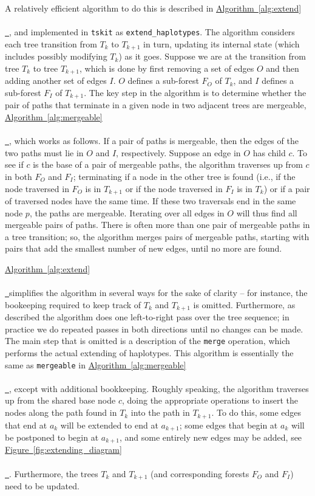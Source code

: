 \documentclass[10pt,twoside,lineno]{gsajnl}
\newcommand{\tskit}{\texttt{tskit}}
\newcommand{\algorithmref}[2][]{%
	\hyperref[{#2}]{%
		Algorithm~\ref*{#2}%
		\ifx\\#1\\%
		\else
		\,#1%
		\fi
	}%
}
\newcommand*{\figref}[2][]{%
	\hyperref[{#2}]{%
		Figure~\ref*{#2}%
		\ifx\\#1\\%
		\else
		\,#1%
		\fi
	}%
}
\begin{document}
A relatively efficient algorithm to do this is described in \algorithmref{alg:extend}, 
and implemented in \tskit{} as \texttt{extend\_haplotypes}.
The algorithm considers each tree transition from $T_k$ to $T_{k+1}$ in turn, updating its internal state
(which includes possibly modifying $T_k$) as it goes.
Suppose we are at the transition from tree $T_k$ to tree $T_{k+1}$,
which is done by first removing a set of edges $O$
and then adding another set of edges $I$.
$O$ defines a sub-forest $F_O$ of $T_k$,
and $I$ defines a sub-forest $F_I$ of $T_{k+1}$.
The key step in the algorithm is to determine whether the pair of paths
that terminate in a given node in two adjacent trees are mergeable,
\algorithmref{alg:mergeable}, which works as follows.
If a pair of paths is mergeable,
then the edges of the two paths must lie in $O$ and $I$, respectively.
Suppose an edge in $O$ has child $c$.
To see if $c$ is the base of a pair of mergeable paths,
the algorithm traverses up from $c$ in both $F_O$ and $F_I$;
terminating if a node in the other tree is found
(i.e., if the node traversed in $F_O$ is in $T_{k+1}$ or if the node traversed in $F_I$ is in $T_k$)
or if a pair of traversed nodes have the same time.
If these two traversals end in the same node $p$, the paths are mergeable.
Iterating over all edges in $O$ will thus find all mergeable pairs of paths.
There is often more than one pair of mergeable paths in a tree transition;
so, the algorithm merges pairs of mergeable paths,
starting with pairs that add the smallest number of new edges,
until no more are found.


\algorithmref{alg:extend} simplifies the algorithm in several ways for the sake of clarity --
for instance, the bookeeping required to keep track of $T_k$ and $T_{k+1}$ is omitted.
Furthermore, as described the algorithm does one left-to-right pass over the tree sequence;
in practice we do repeated passes in both directions until no changes can be made.
The main step that is omitted is a description of the \texttt{merge} operation,
which performs the actual extending of haplotypes.
This algorithm is essentially the same as \texttt{mergeable} in \algorithmref{alg:mergeable},
except with additional bookkeeping.
Roughly speaking, the algorithm
traverses up from the shared base node $c$,
doing the appropriate operations to insert the nodes along the path found in $T_k$
into the path in $T_{k+1}$.
To do this, some edges that end at $a_k$ will be extended to end at $a_{k+1}$;
some edges that begin at $a_k$ will be postponed to begin at $a_{k+1}$,
and some entirely new edges may be added, see \figref{fig:extending_diagram}.
Furthermore, the trees $T_k$ and $T_{k+1}$ (and corresponding forests $F_O$ and $F_I$)
need to be updated.
\end{document}
